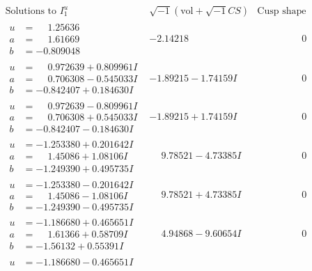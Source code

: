 \documentclass[1p]{elsarticle_modified}
\theoremstyle{definition}
\newcommand{\I}{\sqrt{-1}}
\begin{document}
$$\begin{array}{c|c|c}
\text{Solutions to }I^u_{1}& \I (\text{vol} + \sqrt{-1}CS) & \text{Cusp shape}\\
 \hline 
\begin{aligned}
u &= \phantom{-}1.25636\phantom{ +0.000000I} \\
a &= \phantom{-}1.61669\phantom{ +0.000000I} \\
b &= -0.809048\phantom{ +0.000000I}\end{aligned}
 & -2.14218\phantom{ +0.000000I} & \phantom{-0.000000 } 0 \\ \hline\begin{aligned}
u &= \phantom{-}0.972639 + 0.809961 I \\
a &= \phantom{-}0.706308 - 0.545033 I \\
b &= -0.842407 + 0.184630 I\end{aligned}
 & -1.89215 - 1.74159 I & \phantom{-0.000000 } 0 \\ \hline\begin{aligned}
u &= \phantom{-}0.972639 - 0.809961 I \\
a &= \phantom{-}0.706308 + 0.545033 I \\
b &= -0.842407 - 0.184630 I\end{aligned}
 & -1.89215 + 1.74159 I & \phantom{-0.000000 } 0 \\ \hline\begin{aligned}
u &= -1.253380 + 0.201642 I \\
a &= \phantom{-}1.45086 + 1.08106 I \\
b &= -1.249390 + 0.495735 I\end{aligned}
 & \phantom{-}9.78521 - 4.73385 I & \phantom{-0.000000 } 0 \\ \hline\begin{aligned}
u &= -1.253380 - 0.201642 I \\
a &= \phantom{-}1.45086 - 1.08106 I \\
b &= -1.249390 - 0.495735 I\end{aligned}
 & \phantom{-}9.78521 + 4.73385 I & \phantom{-0.000000 } 0 \\ \hline\begin{aligned}
u &= -1.186680 + 0.465651 I \\
a &= \phantom{-}1.61366 + 0.58709 I \\
b &= -1.56132 + 0.55391 I\end{aligned}
 & \phantom{-}4.94868 - 9.60654 I & \phantom{-0.000000 } 0 \\ \hline\begin{aligned}
u &= -1.186680 - 0.465651 I \\

\end{aligned}
\end{array}$$
\end{document}
